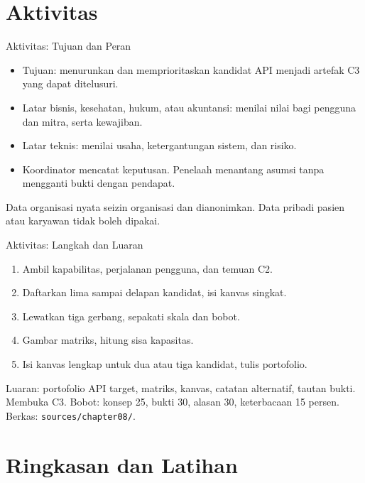 \documentclass[aspectratio=169, table, 12pt]{beamer}
\begin{document}
\section{Aktivitas}

\begin{frame}{{\Large Aktivitas: Tujuan dan Peran}}
  \vspace{6pt}
  \begin{itemize}
    \item Tujuan: menurunkan dan memprioritaskan kandidat API menjadi artefak C3 yang dapat ditelusuri.
    \item Latar bisnis, kesehatan, hukum, atau akuntansi: menilai nilai bagi pengguna dan mitra, serta kewajiban.
    \item Latar teknis: menilai usaha, ketergantungan sistem, dan risiko.
    \item Koordinator mencatat keputusan. Penelaah menantang asumsi tanpa mengganti bukti dengan pendapat.
  \end{itemize}
  \vspace{4pt}
  {\small Data organisasi nyata seizin organisasi dan dianonimkan. Data pribadi pasien atau karyawan tidak boleh dipakai.}
\end{frame}

\begin{frame}{{\Large Aktivitas: Langkah dan Luaran}}
  \vspace{4pt}
  \begin{enumerate}
    \item Ambil kapabilitas, perjalanan pengguna, dan temuan C2.
    \item Daftarkan lima sampai delapan kandidat, isi kanvas singkat.
    \item Lewatkan tiga gerbang, sepakati skala dan bobot.
    \item Gambar matriks, hitung sisa kapasitas.
    \item Isi kanvas lengkap untuk dua atau tiga kandidat, tulis portofolio.
  \end{enumerate}
  \vspace{4pt}
  {\small Luaran: portofolio API target, matriks, kanvas, catatan alternatif, tautan bukti. Membuka C3. Bobot: konsep 25, bukti 30, alasan 30, keterbacaan 15 persen. Berkas: \texttt{sources/chapter08/}.}
\end{frame}

\section{Ringkasan dan Latihan}
\end{document}
